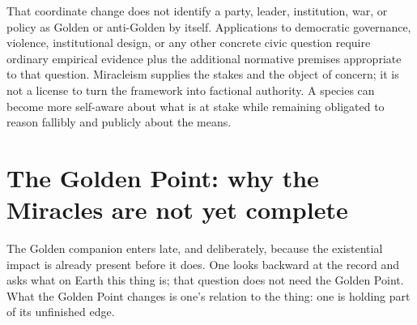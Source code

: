 That coordinate change does not identify a party, leader, institution,
war, or policy as Golden or anti-Golden by itself. Applications to
democratic governance, violence, institutional design, or any other
concrete civic question require ordinary empirical evidence plus the
additional normative premises appropriate to that question. Miracleism
supplies the stakes and the object of concern; it is not a license to
turn the framework into factional authority. A species can become more
self-aware about what is at stake while remaining obligated to reason
fallibly and publicly about the means.

\section{The Golden Point: why the Miracles are not yet complete}\label{sec:golden}

The Golden companion enters late, and deliberately, because the
existential impact is already present before it does. One looks
backward at the record and asks what on Earth this thing is; that
question does not need the Golden Point. What the Golden Point changes
is one's relation to the thing: one is holding part of its unfinished
edge.

